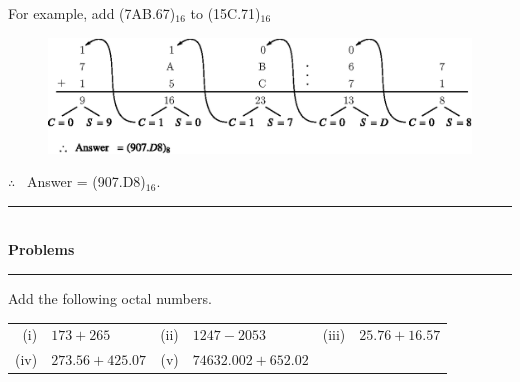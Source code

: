 For example, add (7AB.67)$_{16}$  to (15C.71)$_{16}$
\begin{figure}[H]
\centering
\includegraphics{chap5/div47.eps}
\end{figure}

\noindent
$\therefore$~ Answer = (907.D8)$_{16}$.

\begin{center}
\rule{4cm}{1pt}\\
{\bf\Large Problems}\\[-3pt]
\rule{4cm}{1pt}
\end{center}

\begin{problem}\label{prob5.32}
Add the following octal numbers.
\begin{center}
\begin{tabular}{r@{\;\,}l@{\qquad}r@{\;\,}l@{\qquad}r@{\;\,}l}
(i) & $173+265$ & (ii) & $1247-2053$ & (iii) & $25.76+16.57$\\[3pt]
(iv) & $273.56+425.07$ & (v) & $74632.002+652.02$ &
\end{tabular}
\end{center}
\end{problem}

